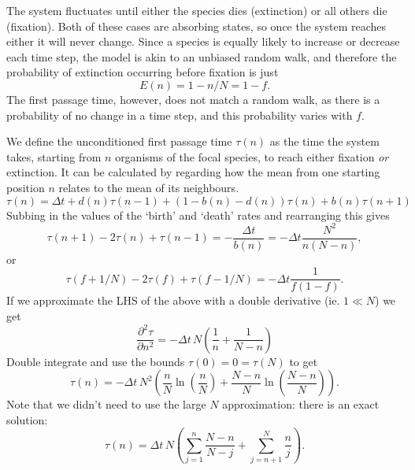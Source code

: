 The system fluctuates until either the species dies (extinction) or all others die (fixation).
Both of these cases are absorbing states, so once the system reaches either it will never change.
Since a species is equally likely to increase or decrease each time step, the model is akin to an unbiased random walk, and therefore the probability of extinction occurring before fixation is just
\begin{equation}
E(n) = 1-n/N = 1-f.
\end{equation}
The first passage time, however, does not match a random walk, as there is a probability of no change in a time step, and this probability varies with $f$.

We define the unconditioned first passage time $\tau(n)$ as the time the system takes, starting from $n$ organisms of the focal species, to reach either fixation \emph{or} extinction.
It can be calculated by regarding how the mean from one starting position $n$ relates to the mean of its neighbours.
\begin{equation}
\tau(n) = \Delta t + d(n)\tau(n-1) + \left(1-b(n)-d(n)\right)\tau(n) + b(n)\tau(n+1)
\end{equation}
Subbing in the values of the `birth' and `death' rates and rearranging this gives
\begin{equation}
\tau(n+1) - 2\tau(n) + \tau(n-1) = -\frac{\Delta t}{b(n)} = -\Delta t\frac{N^2}{n(N-n)},
\end{equation}
or
\begin{equation}
\tau(f+1/N) - 2\tau(f) + \tau(f-1/N) = -\Delta t\frac{1}{f(1-f)}.
\end{equation}
If we approximate the LHS of the above with a double derivative (ie. $1\ll N$) we get
\begin{equation}
\frac{\partial^2\tau}{\partial n^2} = -\Delta t\,N\left(\frac{1}{n}+\frac{1}{N-n}\right)
\end{equation}
Double integrate and use the bounds $\tau(0) = 0 = \tau(N)$ to get
\begin{equation}
\tau(n) = -\Delta t\,N^2\left(\frac{n}{N}\ln\left(\frac{n}{N}\right)+\frac{N-n}{N}\ln\left(\frac{N-n}{N}\right)\right).
\end{equation}
Note that we didn't need to use the large $N$ approximation: there is an exact solution:
\begin{equation}
\tau(n) = \Delta t\,N\left(\sum_{j=1}^n\frac{N-n}{N-j} + \sum_{j=n+1}^N\frac{n}{j}\right).
\end{equation}


